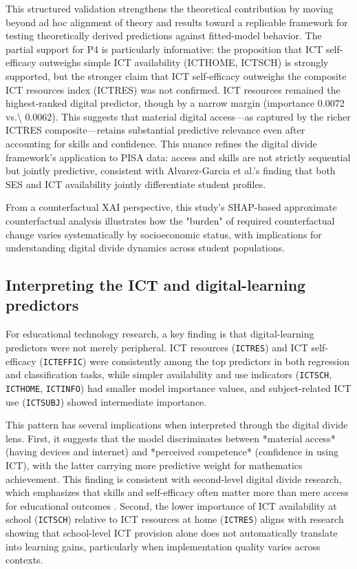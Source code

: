 \documentclass[pdflatex,sn-mathphys-ay]{sn-jnl}
\begin{document}


This structured validation strengthens the theoretical contribution by moving beyond ad hoc alignment of theory and results toward a replicable framework for testing theoretically derived predictions against fitted-model behavior. The partial support for P4 is particularly informative: the proposition that ICT self-efficacy outweighs simple ICT availability (ICTHOME, ICTSCH) is strongly supported, but the stronger claim that ICT self-efficacy outweighs the composite ICT resources index (ICTRES) was not confirmed. ICT resources remained the highest-ranked digital predictor, though by a narrow margin (importance 0.0072 vs.\textbackslash{} 0.0062). This suggests that material digital access---as captured by the richer ICTRES composite---retains substantial predictive relevance even after accounting for skills and confidence. This nuance refines the digital divide framework's application to PISA data: access and skills are not strictly sequential but jointly predictive, consistent with Alvarez-Garcia et al.'s \citep{Gomez_Talal_2024_clusters} finding that both SES and ICT availability jointly differentiate student profiles.

From a counterfactual XAI perspective, this study's SHAP-based approximate counterfactual analysis illustrates how the "burden" of required counterfactual change varies systematically by socioeconomic status, with implications for understanding digital divide dynamics across student populations.

\FloatBarrier
\subsection{Interpreting the ICT and digital-learning predictors}

For educational technology research, a key finding is that digital-learning predictors were not merely peripheral. ICT resources (\texttt{ICTRES}) and ICT self-efficacy (\texttt{ICTEFFIC}) were consistently among the top predictors in both regression and classification tasks, while simpler availability and use indicators (\texttt{ICTSCH}, \texttt{ICTHOME}, \texttt{ICTINFO}) had smaller model importance values, and subject-related ICT use (\texttt{ICTSUBJ}) showed intermediate importance.

This pattern has several implications when interpreted through the digital divide lens. First, it suggests that the model discriminates between *material access* (having devices and internet) and *perceived competence* (confidence in using ICT), with the latter carrying more predictive weight for mathematics achievement. This finding is consistent with second-level digital divide research, which emphasizes that skills and self-efficacy often matter more than mere access for educational outcomes \citep{Scheerder_2017,Hargittai_2010}. Second, the lower importance of ICT availability at school (\texttt{ICTSCH}) relative to ICT resources at home (\texttt{ICTRES}) aligns with research showing that school-level ICT provision alone does not automatically translate into learning gains, particularly when implementation quality varies across contexts.
\end{document}
